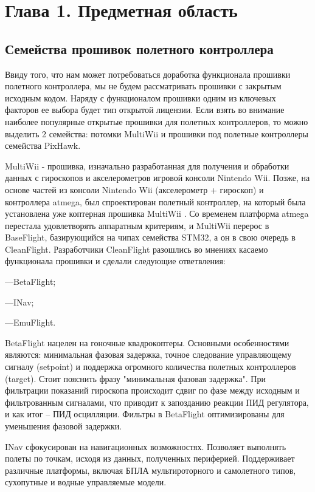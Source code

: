 
\section{Глава 1. Предметная область}


\subsection{Семейства прошивок полетного контроллера}
Ввиду того, что нам может потребоваться доработка функционала прошивки полетного контроллера, мы не будем рассматривать прошивки с закрытым исходным кодом. Наряду с функционалом прошивки одним из ключевых факторов ее выбора будет тип открытой лицензии. Если взять во внимание наиболее популярные открытые прошивки для полетных контроллеров, то можно выделить 2 семейства: потомки MultiWii и прошивки под полетные контроллеры семейства PixHawk.

MultiWii - прошивка, изначально разработанная для получения и обработки данных с гироскопов и акселерометров игровой консоли Nintendo Wii. Позже, на основе частей из консоли Nintendo Wii (акселерометр + гироскоп) и контроллера atmega, был спроектирован полетный контроллер, на который была установлена уже коптерная прошивка MultiWii \cite{multiwii}. Со временем платформа atmega перестала удовлетворять аппаратным критериям, и MultiWii перерос в BaseFlight, базирующийся на чипах семейства STM32, а он в свою очередь в CleanFlight. Разработчики CleanFlight разошлись во мнениях касаемо функционала прошивки и сделали следующие ответвления:

---BetaFlight;

---INav;

---EmuFlight.

BetaFlight нацелен на гоночные квадрокоптеры. Основными особенностями являются: минимальная фазовая задержка, точное следование управляющему сигналу (setpoint) и поддержка огромного количества полетных контроллеров (target).
Стоит пояснить фразу "минимальная фазовая задержка". При фильтрации показаний гироскопа происходит сдвиг по фазе между исходным и фильтрованным сигналами, что приводит к запозданию реакции ПИД регулятора, и как итог -- ПИД осцилляции. Фильтры в BetaFlight оптимизированы для уменьшения фазовой задержки.

INav сфокусирован на навигационных возможностях. Позволяет выполнять полеты по точкам, исходя из данных, полученных периферией. Поддерживает различные платформы, включая БПЛА мультироторного и самолетного типов, сухопутные и водные управляемые модели.

